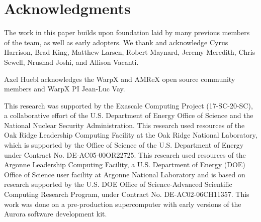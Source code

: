 \section{Acknowledgments}


The work in this paper builds upon foundation laid by many previous members of the \vtkm team, as well as early adopters.  We thank and acknowledge
Cyrus Harrison, 
Brad King, 
Matthew Larsen,
Robert Maynard, 
Jeremy Meredith, 
Chris Sewell,
Nrushad Joshi,
and
Allison Vacanti.

Axel Huebl acknowledges the WarpX and AMReX open source community members and WarpX PI Jean-Luc Vay.

This research was supported by the Exascale Computing Project (17-SC-20-SC), a collaborative effort of the U.S. Department of Energy Office of Science and the National Nuclear Security Administration.
This research used resources of the Oak Ridge Leadership Computing Facility at the Oak Ridge National Laboratory, which is supported by the Office of Science of the U.S. Department of Energy under Contract No. DE-AC05-00OR22725.
This research used resources of the Argonne Leadership Computing Facility, a U.S. Department of Energy (DOE) Office of Science user facility at Argonne National Laboratory and is based on research supported by the U.S. DOE Office of Science-Advanced Scientific Computing Research Program, under Contract No. DE-AC02-06CH11357. This work was done on a pre-production supercomputer with early versions of the Aurora software development kit.
